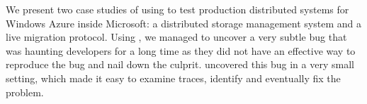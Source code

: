 We present two case studies of using \psharp to test production distributed systems for Windows Azure inside Microsoft: a distributed storage management system and a live migration protocol. Using \psharp, we managed to uncover a very subtle bug that was haunting developers for a long time as they did not have an effective way to reproduce the bug and nail down the culprit. \psharp uncovered this bug in a very small setting, which made it easy to examine traces, identify and eventually fix the problem.
